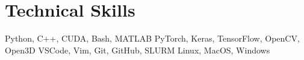 \section{Technical Skills}

\setlength{\multicolsep}{-4pt}
\begin{multicols}{2}
	\raggedcolumns{}

	\resumeSubHeadingListStart{}
	{Python, C++, CUDA, Bash, MATLAB}
	{PyTorch, Keras, TensorFlow, OpenCV, Open3D}
	{VSCode, Vim, Git, GitHub, SLURM}
	{Linux, MacOS, Windows}
	\resumeSubHeadingListEnd{}

\end{multicols}

